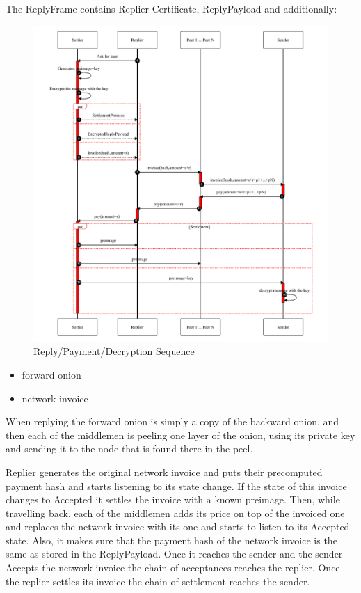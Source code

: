 \documentclass{article}
\begin{document}
The ReplyFrame contains Replier Certificate, ReplyPayload and additionally:

\begin{figure}
	\centering
	\includegraphics[scale=0.8]{ReplyAndPay.pdf}
	\caption{Reply/Payment/Decryption Sequence}
	\label{fig:replyandpay}
\end{figure}

\begin{itemize}
	\item  forward onion
	\item  network invoice
\end{itemize}

When replying the forward onion is simply a copy of the backward onion, and then each of the middlemen is peeling one layer of the onion, using its private key and sending it to the node that is found there in the peel.

Replier generates the original network invoice and puts their precomputed payment hash and starts listening to its state change. If the state of this invoice changes to Accepted it settles the invoice with a known preimage.
Then, while travelling back, each of the middlemen adds its price on top of the invoiced one and replaces the network invoice with its one and starts to listen to its Accepted state. Also, it makes sure that the payment hash of the network invoice is the same as stored in the ReplyPayload.
Once it reaches the sender and the sender Accepts the network invoice the chain of acceptances reaches the replier. Once the replier settles its invoice the chain of settlement reaches the sender.
\end{document}
